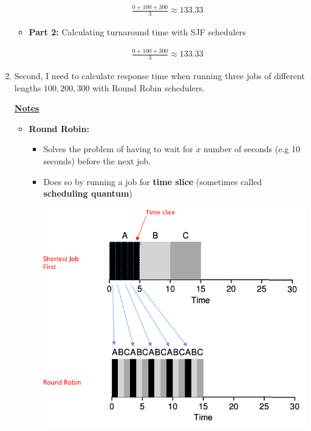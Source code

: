 \documentclass[12pt]{article}
\begin{document}
\begin{enumerate}[1.]
\begin{itemize}
        \bigskip

        \begin{align}
            \frac{0 + 100 + 300}{3} \approx 133.33
        \end{align}

        \item \textbf{Part 2:} Calculating turnaround time with SJF schedulers

        \begin{align}
            \frac{0 + 100 + 300}{3} \approx 133.33
        \end{align}

    \end{itemize}

    \item

    Second, I need to calculate response time when running three jobs of different lengths
    $100, 200, 300$ with Round Robin schedulers.

    \bigskip

    \underline{\textbf{Notes}}

    \begin{itemize}
        \item \textbf{Round Robin:}

        \begin{itemize}
            \item Solves the problem of having to wait for $x$ number of seconds (e.g 10 seconds)
            before the next job.

            \item Does so by running a job for \textbf{time slice} (sometimes called \textbf{scheduling quantum})


            \begin{center}
            \includegraphics[width=0.8\linewidth]{images/worksheet_4_solution_4.png}
            \end{center}
        \end{itemize}
    \end{itemize}

\end{enumerate}
\end{document}
